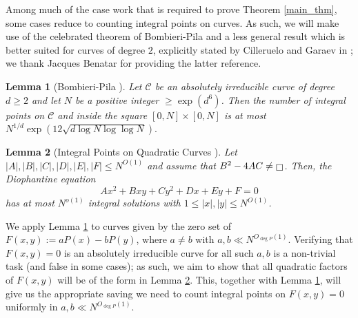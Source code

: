 \documentclass[11pts]{amsart}
\numberwithin{equation}{section}
\newtheorem{lem}{Lemma}[section]
\let\oldsquare\square
\renewcommand{\square}[1][-1pt]{%
 {\raisebox{#1}{$\oldsquare$}}%
}
\begin{document}
Among much of the case work that is required to prove Theorem \ref{main_thm}, some cases reduce to counting integral points on curves. As such, we will make use of the celebrated theorem of Bombieri-Pila and a less general result which is better suited for curves of degree $2$, explicitly stated by Cilleruelo and Garaev in \cite{Jacques_Quaratic}; we thank Jacques Benatar for providing the latter reference.

\begin{lem}[Bombieri-Pila {\cite[Theorem 5]{Bombieri-Pila}}]
\label{Bombieri-Pila_Lemma}
    Let $\mathcal{C}$ be an absolutely irreducible curve of degree $d\geq 2$ and let $N$ be a positive integer $\geq \exp(d^6)$. Then the number of integral points on $\mathcal{C}$ and inside the square $[0,N]\times [0,N]$ is at most $N^{1/d}\exp\left(12\sqrt{d\log N\log\log N}\right).$
\end{lem}

\begin{lem}[Integral Points on Quadratic Curves {\cite[Proposition 1]{Jacques_Quaratic}}]
\label{Quadratic_Curves}
Let $|A|,|B|,|C|,|D|,|E|,|F|\leq N^{O(1)}$ and assume that $B^2 - 4AC\neq \square$. Then, the Diophantine equation
\[
Ax^2 + Bxy + Cy^2 + Dx + Ey + F = 0 
\]
has at most $N^{o(1)}$ integral solutions with $1 \leq |x|, |y| \leq N^{O(1)}$.
\end{lem}

We apply Lemma \ref{Bombieri-Pila_Lemma} to curves given by the zero set of $F(x,y):=aP(x)-bP(y)$, where $a\neq b$ with $a,b\ll N^{O_{\deg P}(1)}$. Verifying that $F(x,y)=0$ is an absolutely irreducible curve for all such $a,b$ is a non-trivial task (and false in some cases); as such, we aim to show that all quadratic factors of $F(x,y)$ will be of the form in Lemma \ref{Quadratic_Curves}. This, together with Lemma \ref{Bombieri-Pila_Lemma}, will give us the appropriate saving we need to count integral points on $F(x,y)=0$ uniformly in $a,b\ll N^{O_{\deg P}(1)}$. 
\end{document}
